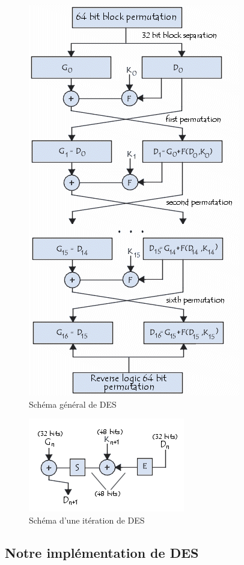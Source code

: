 \documentclass[a4paper,12pt]{article}
\begin{document}
\begin{figure}[h]
\centering
\includegraphics[scale=0.80]{./images/DES_diagram.png}
\caption{Schéma général de DES}
\label{fig:DES-diagram}
\end{figure}

\clearpage

\begin{figure}[h]
\centering
\includegraphics[scale=0.80]{./images/DES_round.png}
\caption{Schéma d'une itération de DES}
\label{fig:DES-round}
\end{figure}

\subsection{Notre implémentation de DES}
\end{document}
